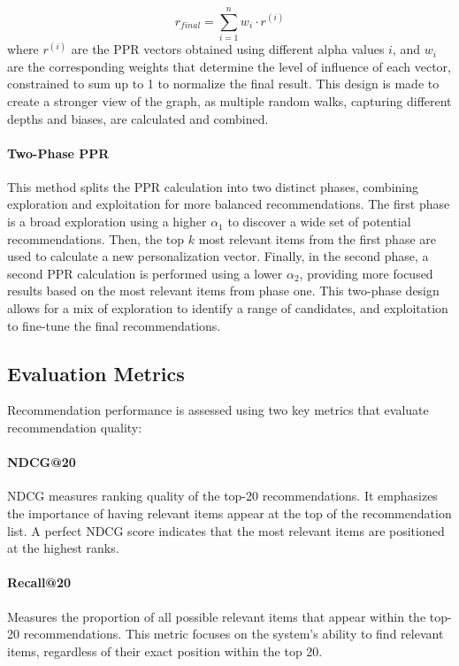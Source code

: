 \documentclass[conference,compsoc]{IEEEtran}
\begin{document}
        \begin{equation}
        r_{final} = \sum_{i=1}^n w_i \cdot r^{(i)}
        \end{equation}
     where \(r^{(i)}\) are the PPR vectors obtained using different alpha values \(i\), and \(w_i\) are the corresponding weights that determine the level of influence of each vector, constrained to sum up to 1 to normalize the final result. This design is made to create a stronger view of the graph, as multiple random walks, capturing different depths and biases, are calculated and combined.

\paragraph{\textbf{Two-Phase PPR}}
This method splits the PPR calculation into two distinct phases, combining exploration and exploitation for more balanced recommendations. The first phase is a broad exploration using a higher \(\alpha_1\) to discover a wide set of potential recommendations. Then, the top $k$ most relevant items from the first phase are used to calculate a new personalization vector. Finally, in the second phase, a second PPR calculation is performed using a lower \(\alpha_2\), providing more focused results based on the most relevant items from phase one. This two-phase design allows for a mix of exploration to identify a range of candidates, and exploitation to fine-tune the final recommendations.

\subsection{Evaluation Metrics}
Recommendation performance is assessed using two key metrics that evaluate recommendation quality:

\paragraph{\textbf{NDCG@20}}
NDCG measures ranking quality of the top-20 recommendations. It emphasizes the importance of having relevant items appear at the top of the recommendation list. A perfect NDCG score indicates that the most relevant items are positioned at the highest ranks.

\paragraph{\textbf{Recall@20}}
Measures the proportion of all possible relevant items that appear within the top-20 recommendations. This metric focuses on the system's ability to find relevant items, regardless of their exact position within the top 20.
\end{document}
